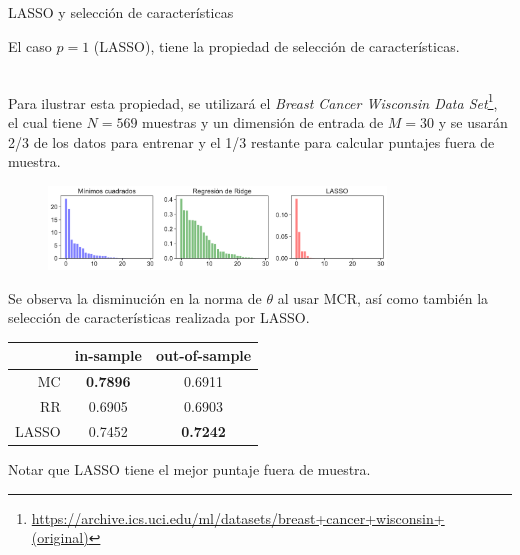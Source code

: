 \documentclass[handout, 9pt]{beamer}
\begin{document}
\begin{frame}{LASSO y selección de características}

El caso $p=1$ (LASSO), tiene la propiedad de selección de características.\\~\ \pause

Para ilustrar esta propiedad, se utilizará el \emph{Breast Cancer Wisconsin Data Set}\footnote{\url{https://archive.ics.uci.edu/ml/datasets/breast+cancer+wisconsin+(original)}}, el cual tiene $N=569$ muestras y un dimensión de entrada de $M=30$ y se usarán 2/3 de los datos para entrenar y el 1/3 restante para calcular puntajes fuera de muestra. \\

\begin{figure}[H]
	\centering
	\includegraphics[width=0.8\textwidth]{../img/cap2_OLS_RR_LASSO.pdf}
\end{figure} \pause

Se observa la disminución en la norma de $\theta$ al usar MCR, así como también la selección de características realizada por LASSO.\pause

\begin{table}[h]
\centering
\footnotesize
	\begin{tabular}{ r|c|c } 
		 & in-sample & out-of-sample \\
		\hline
		MC & \textbf{0.7896} & 0.6911 \\ 
		RR & 0.6905 & 0.6903 \\ 
		LASSO & 0.7452 & \textbf{0.7242}
	\end{tabular}
\end{table}

 Notar que LASSO tiene el mejor puntaje fuera de muestra.

\end{frame}
\end{document}
